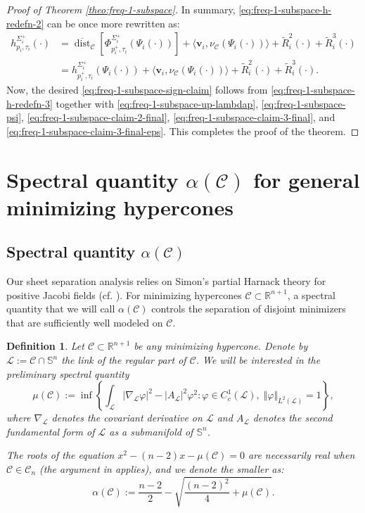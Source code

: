 \documentclass[11pt, letterpaper, reqno]{amsart}
\numberwithin{equation}{section}
\newtheorem{Def}{Definition}[section]
\theoremstyle{remark}
\newcommand{\RR}{\mathbb{R}}
\newcommand{\SSp}{\mathbb{S}}
\newcommand{\cC}{\mathcal{C}}
\newcommand{\cL}{\mathcal{L}}
\newcommand{\mbfv}{\mathbf{v}}
\newcommand{\dist}{\operatorname{dist}}
\newcommand{\Sdist}{\overline{\dist}}
\begin{document}
\begin{proof}[Proof of Theorem \ref{theo:freq-1-subspace}]
In summary, \eqref{eq:freq-1-subspace-h-redefn-2} can be once more rewritten as:
\begin{align}
	h^{\Sigma_i^+}_{p_i,\tau_i}(\cdot) 
		& = \Sdist_{\cC} \left[ \Phi^{\Sigma_i^+}_{p_i^+, \tau_i}(\Psi_i(\cdot)) \right] + \langle \mbfv_i, \nu_\cC(\Psi_i(\cdot)) \rangle + \tilde R^2_i(\cdot) + \tilde R^3_i(\cdot) \nonumber \\
		& = h^{\Sigma_i^+}_{p_i^+,\tau_i}(\Psi_i(\cdot)) + \langle \mbfv_i, \nu_\cC(\Psi_i(\cdot)) \rangle + \tilde R^2_i(\cdot) + \tilde R^3_i(\cdot). \label{eq:freq-1-subspace-h-redefn-3}
\end{align}
Now, the desired \eqref{eq:freq-1-subspace-sign-claim} follows from \eqref{eq:freq-1-subspace-h-redefn-3} together with \eqref{eq:freq-1-subspace-up-lambdap}, \eqref{eq:freq-1-subspace-psi}, \eqref{eq:freq-1-subspace-claim-2-final}, \eqref{eq:freq-1-subspace-claim-3-final}, and \eqref{eq:freq-1-subspace-claim-3-final-eps}. This completes the proof of the theorem.
\end{proof}


\section{Spectral quantity $\alpha(\cC)$ for general minimizing hypercones} \label{sec:kappa.lambda}

\subsection{Spectral quantity $\alpha(\cC)$} 

Our sheet separation analysis relies on Simon's partial Harnack theory for positive Jacobi fields (cf. \cite[Appendix A]{Wang:smoothing}). For minimizing hypercones $\cC \subset \RR^{n+1}$, a spectral quantity that we will call $\alpha(\cC)$ controls the separation of disjoint minimizers that are sufficiently well modeled on $\cC$. 

\begin{Def} \label{defi:kappa.lambda}
	Let $\cC \subset \RR^{n+1}$ be any minimizing hypercone. Denote by $\cL := \cC \cap \SSp^n$ the link of the regular part of $\cC$. We will be interested in the preliminary spectral quantity
	\begin{equation} \label{eq:lambda}
		\mu(\cC) := \inf \left\{ \int_\cL |\nabla_\cL \varphi|^2 - |A_\cL|^2 \varphi^2 : \varphi \in C^1_c(\cL), \; \Vert \varphi \Vert_{L^2(\cL)} = 1 \right\},
	\end{equation}
	where $\nabla_\cL$ denotes the covariant derivative on $\cL$ and $A_\cL$ denotes the second fundamental form of $\cL$ as a submanifold of $\SSp^n$.
	
	The roots of the equation $x^2 - (n-2) x - \mu(\cC) = 0$ are necessarily real when $\cC \in \mathscr{C}_n$ (the argument in \cite[Section 4]{CaffarelliHardtSimon} applies), and we denote the smaller as:
	\begin{equation} \label{eq:kappa}
		\alpha(\cC) := \frac{n-2}{2} - \sqrt{\frac{(n-2)^2}{4} + \mu(\cC)}.
	\end{equation}
\end{Def}
\end{document}
